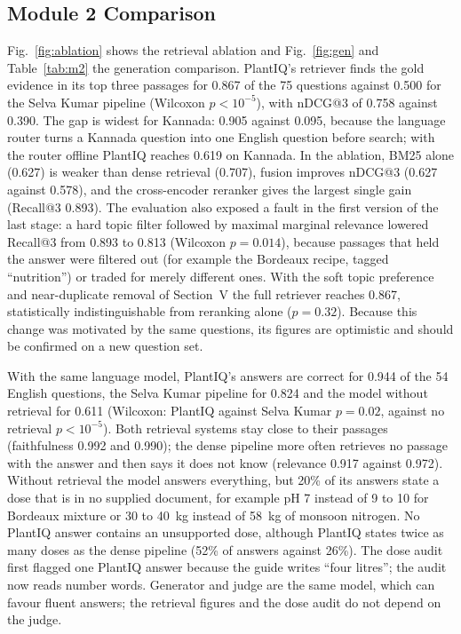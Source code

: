 \subsection{Module 2 Comparison}
Fig.~\ref{fig:ablation} shows the retrieval ablation and Fig.~\ref{fig:gen} and Table~\ref{tab:m2} the generation
comparison. PlantIQ's retriever finds the gold evidence in its top three passages for 0.867 of the 75 questions
against 0.500 for the Selva Kumar pipeline (Wilcoxon $p<10^{-5}$), with nDCG@3 of 0.758 against 0.390. The gap is
widest for Kannada: 0.905 against 0.095, because the language router turns a Kannada question into one English question
before search; with the router offline PlantIQ reaches 0.619 on Kannada. In the ablation, BM25 alone (0.627) is weaker
than dense retrieval (0.707), fusion improves nDCG@3 (0.627 against 0.578), and the cross-encoder
reranker gives the largest single gain (Recall@3 0.893). The evaluation also exposed a fault in the first version of the last stage:
a hard topic filter followed by maximal marginal relevance lowered Recall@3 from 0.893 to 0.813 (Wilcoxon $p=0.014$),
because passages that held the answer were filtered out (for example the Bordeaux recipe, tagged ``nutrition'') or traded
for merely different ones. With the soft topic preference and near-duplicate removal of Section~V the full retriever
reaches 0.867, statistically indistinguishable from reranking alone ($p=0.32$). Because this change was
motivated by the same questions, its figures are optimistic and should be confirmed on a new question set.

With the same language model, PlantIQ's answers are correct for 0.944 of the 54 English questions, the Selva Kumar
pipeline for 0.824 and the model without retrieval for 0.611 (Wilcoxon: PlantIQ against Selva Kumar
$p=0.02$, against no retrieval $p<10^{-5}$). Both retrieval systems stay close to their passages (faithfulness
0.992 and 0.990); the dense pipeline more often retrieves no passage with the answer and then says it does
not know (relevance 0.917 against 0.972). Without retrieval the model answers everything, but
20\% of its answers state a dose that is in no supplied document, for example pH 7 instead of 9 to 10 for Bordeaux mixture
or 30 to 40~kg instead of 58~kg of monsoon nitrogen. No PlantIQ answer contains an unsupported dose, although PlantIQ states
twice as many doses as the dense pipeline (52\% of answers against 26\%). The dose audit first flagged one PlantIQ
answer because the guide writes ``four litres''; the audit now reads number words. Generator and judge are the same
model, which can favour fluent answers; the retrieval figures and the dose audit do not depend on the judge.

